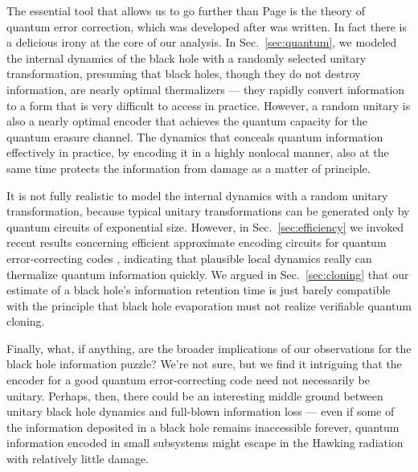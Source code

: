 \documentclass[12pt]{article}
\begin{document}
The essential tool that allows us to go further than Page is the theory of quantum error correction, which was developed after \cite{page-entropy} was written. In fact there is a delicious irony at the core of our analysis. In Sec.~\ref{sec:quantum}, we modeled the internal dynamics of the black hole with a randomly selected unitary transformation, presuming that black holes, though they do not destroy information, are nearly optimal thermalizers --- they rapidly convert information to a form that is very difficult to access in practice. However, a random unitary is also a nearly optimal encoder that achieves the quantum capacity for the quantum erasure channel. The dynamics that conceals quantum information effectively in practice, by encoding it in a highly nonlocal manner, also at the same time protects the information from damage as a matter of principle. 

It is not fully realistic to model the internal dynamics with a random unitary transformation, because typical unitary transformations can be generated only by quantum circuits of exponential size. However, in Sec.~\ref{sec:efficiency} we invoked recent results concerning efficient approximate encoding circuits for quantum error-correcting codes \cite{cleve,dankert}, indicating that plausible local dynamics really can thermalize quantum information quickly. We argued in Sec.~\ref{sec:cloning} that our estimate of a black hole's information retention time is just barely compatible with the principle that black hole evaporation must not realize verifiable quantum cloning.

Finally, what, if anything, are the broader implications of our observations for the black hole information puzzle? We're not sure, but we find it intriguing that the encoder for a good quantum error-correcting code need not necessarily be unitary. Perhaps, then, there could be an interesting middle ground between unitary black hole dynamics and full-blown information loss --- even if some of the information deposited in a black hole remains inaccessible forever, quantum information encoded in small subsystems might escape in the Hawking radiation with relatively little damage.
\end{document}
